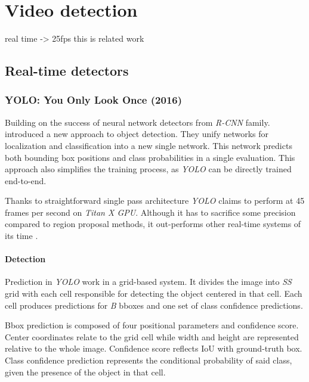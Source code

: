
\chapter{Video detection}
\label{chap:rltm}

real time -> 25fps
this is related work

\section{Real-time detectors}

\subsection{YOLO: You Only Look Once (2016)}
\label{sec:yolo}
Building on the success of neural network detectors from \textit{R-CNN} family. \citeauthor{bib:yolo} \cite{bib:yolo} introduced a new approach to object detection. They unify networks for localization and classification into a new single network. This network predicts both bounding box positions and class probabilities in a single evaluation. This approach also simplifies the training process, as \textit{YOLO} can be directly trained end-to-end. 

Thanks to straightforward single pass architecture \textit{YOLO} claims to perform at 45 frames per second on \textit{Titan X GPU}. Although it has to sacrifice some precision compared to region proposal methods, it out-performs other real-time systems of its time \cite{bib:overfeat}.


\subsubsection{Detection}
Prediction in \textit{YOLO} work in a grid-based system. It divides the image into \textit{S\x S} grid with each cell responsible for detecting the object centered in that cell.  Each cell produces predictions for \textit{B} bboxes and one set of class confidence predictions. 

Bbox prediction is composed of four positional parameters and confidence score. Center coordinates relate to the grid cell while width and height are represented relative to the whole image. Confidence score reflects IoU with ground-truth box. Class confidence prediction represents the conditional probability of said class, given the presence of the object in that cell. 

